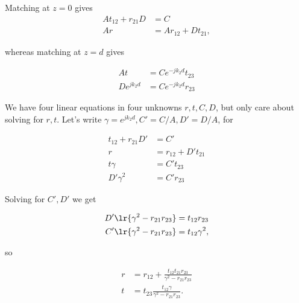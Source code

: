 Matching at \( z = 0 \) gives
\begin{dmath}\label{eqn:twoInterfaceNormal:80}
\begin{aligned}
A t_{12} + r_{21} D &= C \\
A r      &= A r_{12} + D t_{21},
\end{aligned}
\end{dmath}

whereas matching at \( z = d \) gives

\begin{dmath}\label{eqn:twoInterfaceNormal:100}
\begin{aligned}
A t &= C e^{-j k_2 d} t_{23} \\
D e^{j k_2 d} &= C e^{-j k_2 d} r_{23}
\end{aligned}
\end{dmath}

We have four linear equations in four unknowns \( r, t, C, D \), but only care about solving for \( r, t \).  Let's write \(
\gamma = e^{ j k_2 d }, C' = C/A, D' = D/A \), for

\begin{dmath}\label{eqn:twoInterfaceNormal:120}
\begin{aligned}
t_{12} + r_{21} D' &= C' \\
r      &= r_{12} + D' t_{21} \\
t \gamma &= C' t_{23} \\
D' \gamma^2 &= C' r_{23}
\end{aligned}
\end{dmath}

Solving for \( C', D' \) we get

\begin{dmath}\label{eqn:twoInterfaceNormal:140}
\begin{aligned}
D' \lr{ \gamma^2 - r_{21} r_{23} } &= t_{12} r_{23} \\
C' \lr{ \gamma^2 - r_{21} r_{23} } &= t_{12} \gamma^2,
\end{aligned}
\end{dmath}

so

\begin{dmath}\label{eqn:twoInterfaceNormal:160}
\begin{aligned}
r &= r_{12} + \frac{t_{12} t_{21} r_{23} }{\gamma^2 - r_{21} r_{23} } \\
t &= t_{23} \frac{ t_{12} \gamma }{\gamma^2 - r_{21} r_{23} }.
\end{aligned}
\end{dmath}


